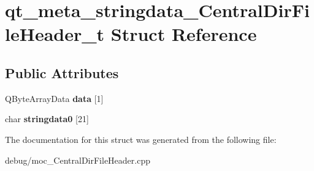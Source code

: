 \hypertarget{structqt__meta__stringdata___central_dir_file_header__t}{}\section{qt\+\_\+meta\+\_\+stringdata\+\_\+\+Central\+Dir\+File\+Header\+\_\+t Struct Reference}
\label{structqt__meta__stringdata___central_dir_file_header__t}
\subsection*{Public Attributes}
\begin{DoxyCompactItemize}
\item 
Q\+Byte\+Array\+Data {\bfseries data} \mbox{[}1\mbox{]}\hypertarget{structqt__meta__stringdata___central_dir_file_header__t_acbf44b4873fe166c37d825a18edc00ae}{}\label{structqt__meta__stringdata___central_dir_file_header__t_acbf44b4873fe166c37d825a18edc00ae}

\item 
char {\bfseries stringdata0} \mbox{[}21\mbox{]}\hypertarget{structqt__meta__stringdata___central_dir_file_header__t_a8919abd1d5e28878f10729445788674a}{}\label{structqt__meta__stringdata___central_dir_file_header__t_a8919abd1d5e28878f10729445788674a}

\end{DoxyCompactItemize}


The documentation for this struct was generated from the following file\+:\begin{DoxyCompactItemize}
\item 
debug/moc\+\_\+\+Central\+Dir\+File\+Header.\+cpp\end{DoxyCompactItemize}
